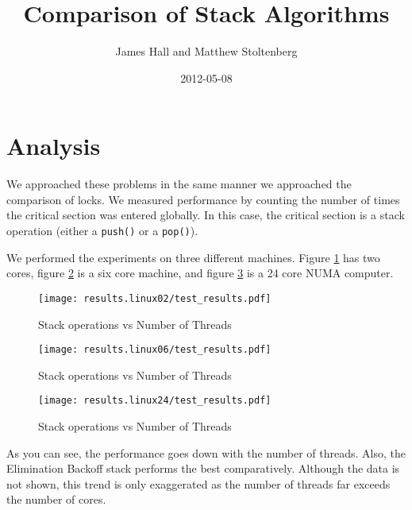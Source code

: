 \documentclass [letterpaper]{article}
\title{Comparison of Stack Algorithms}
\author{James Hall and Matthew Stoltenberg}
\date{2012-05-08}
\begin{document}
    \maketitle

    \section{Analysis}

    We approached these problems in the same manner we approached the comparison of locks.
    We measured performance by counting the number of times the critical section was entered globally.
    In this case, the critical section is a stack operation (either a \verb+push()+ or a \verb+pop()+).

    We performed the experiments on three different machines.
    Figure \ref{figure:results02} has two cores, figure \ref{figure:results06} is a six core machine, and figure \ref{figure:results24} is a 24 core NUMA computer.

    \begin{figure}[hp]
        \caption{Stack operations vs Number of Threads}
        \begin{center}
            \texttt{[image: results.linux02/test\_results.pdf]}
        \end{center}
        \label{figure:results02}
    \end{figure}

    \begin{figure}[hp]
        \caption{Stack operations vs Number of Threads}
        \begin{center}
            \texttt{[image: results.linux06/test\_results.pdf]}
        \end{center}
        \label{figure:results06}
    \end{figure}

    \begin{figure}[hp]
        \caption{Stack operations vs Number of Threads}
        \begin{center}
            \texttt{[image: results.linux24/test\_results.pdf]}
        \end{center}
        \label{figure:results24}
    \end{figure}

    As you can see, the performance goes down with the number of threads.
    Also, the Elimination Backoff stack performs the best comparatively.
    Although the data is not shown, this trend is only exaggerated as the number of threads far exceeds the number of cores.
\end{document}
